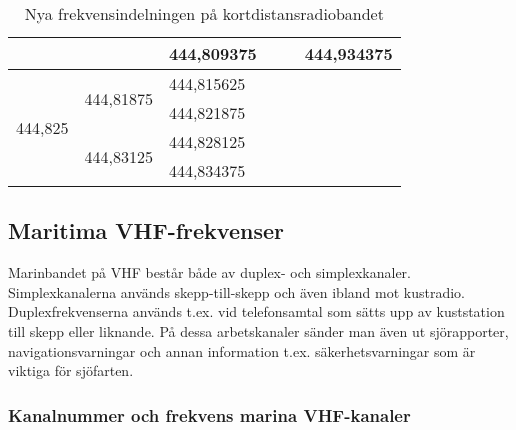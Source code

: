 \begin{table}[h]
\begin{tabular}{|l|l|l|l|l|l|}
		                                               &                                                 & 444,809375                      & \multicolumn{1}{l|}{}                         & \multicolumn{1}{l|}{}                           & \multicolumn{1}{l|}{444,934375} \\ \hline
		\multirow{4}{*}{444,825}                       & \multirow{2}{*}{444,81875}                      & 444,815625                      & \multicolumn{3}{l}{\multirow{4}{*}{}}                                                                                             \\ \cline{3-3}
		                                               &                                                 & 444,821875                      & \multicolumn{3}{l}{}                                                                                                              \\ \cline{2-3}
		                                               & \multirow{2}{*}{444,83125}                      & 444,828125                      & \multicolumn{3}{l}{}                                                                                                              \\ \cline{3-3}
		                                               &                                                 & 444,834375                      & \multicolumn{3}{l}{}                                                                                                              \\ \cline{1-3}
	\end{tabular}
\caption{Nya frekvensindelningen på kortdistansradiobandet}
\label{tab:SRBR-frekvenser}
\end{table}

\clearpage

\subsection{Maritima VHF-frekvenser}

Marinbandet på VHF består både av duplex- och
simplexkanaler. Simplexkanalerna används skepp-till-skepp och även
ibland mot kustradio. Duplexfrekvenserna används t.ex. vid
telefonsamtal som sätts upp av kuststation till skepp eller
liknande. På dessa arbetskanaler sänder man även ut sjörapporter,
navigationsvarningar och annan information t.ex. säkerhetsvarningar
som är viktiga för sjöfarten.

\subsubsection{Kanalnummer och frekvens marina VHF-kanaler}

